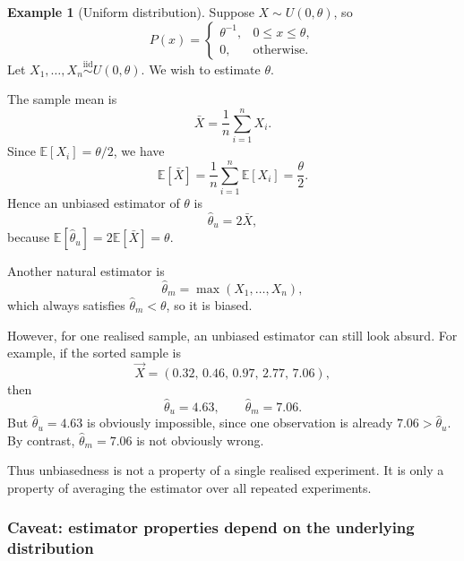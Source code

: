 \documentclass[11pt, titlepage]{article} %
\numberwithin{equation}{section}
\theoremstyle{definition}
\newtheorem*{example*}{Example}
\numberwithin{assumption}{section}
\begin{document}
\begin{example*}[Uniform distribution]
Suppose $X\sim U(0,\theta)$, so
\begin{equation*}
    P(x)=
    \begin{cases}
        \theta^{-1}, & 0\le x\le \theta,\\
        0, & \text{otherwise}.
    \end{cases}
\end{equation*}
Let $X_1,\dots,X_n \overset{\mathrm{iid}}{\sim} U(0,\theta)$. We wish to estimate $\theta$.

The sample mean is
\begin{equation*}
    \bar X=\frac{1}{n}\sum_{i=1}^n X_i.
\end{equation*}
Since $\mathbb{E}[X_i]=\theta/2$, we have
\begin{equation*}
    \mathbb{E}[\bar X]=\frac{1}{n}\sum_{i=1}^n \mathbb{E}[X_i]=\frac{\theta}{2}.
\end{equation*}
Hence an unbiased estimator of $\theta$ is
\begin{equation*}
    \hat{\theta}_u=2\bar X,
\end{equation*}
because $\mathbb{E}[\hat{\theta}_u]=2\mathbb{E}[\bar X]=\theta$.

Another natural estimator is
\begin{equation*}
    \hat{\theta}_m=\max(X_1,\dots,X_n),
\end{equation*}
which always satisfies $\hat{\theta}_m<\theta$, so it is biased.

However, for one realised sample, an unbiased estimator can still look absurd. For example, if the sorted sample is
\begin{equation*}
    \vec X=(0.32,\,0.46,\,0.97,\,2.77,\,7.06),
\end{equation*}
then
\begin{equation*}
    \hat{\theta}_u=4.63,
    \qquad
    \hat{\theta}_m=7.06.
\end{equation*}
But $\hat{\theta}_u=4.63$ is obviously impossible, since one observation is already $7.06>\hat{\theta}_u$. By contrast, $\hat{\theta}_m=7.06$ is not obviously wrong.

Thus unbiasedness is not a property of a single realised experiment. It is only a property of averaging the estimator over all repeated experiments.
\end{example*}

\subsubsection*{Caveat: estimator properties depend on the underlying distribution}
\end{document}
